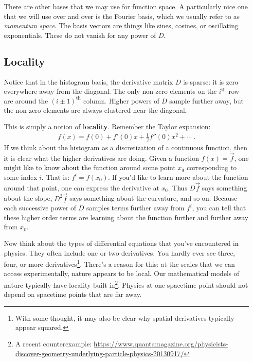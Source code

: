 There are other bases that we may use for function space. A particularly nice one that we will use over and over is the Fourier basis, which we usually refer to as \emph{momentum space}. The basis vectors are things like sines, cosines, or oscillating exponentials. These do not vanish for any power of $D$.


\subsection{Locality}

Notice that in the histogram basis, the derivative matrix $D$ is sparse: it is zero everywhere away from the diagonal. The only non-zero elements on the $i^\text{th}$ row are around the $(i\pm 1)^\text{th}$ column.  Higher powers of $D$ sample further away, but the non-zero elements are always clustered near the diagonal.

This is simply a notion of \textbf{locality}. Remember the Taylor expansion:
\begin{align}
  f(x) = f(0) + f'(0) x + \frac{1}{2} f''(0)x^2 + \cdots \ .
\end{align}
If we think about the histogram as a discretization of a continuous function, then it is clear what the higher derivatives are doing. Given a function $f(x) = \vec{f}$, one might like to know about the function around some point $x_0$ corresponding to some index $i$. That is: $f^i = f(x_0)$. If you’d like to learn more about the function around that point, one can express the derivative at $x_0$. Thus $D\vec{f}$ says something about the slope, $D^2\vec{f}$ says something about the curvature, and so on. Because each successive power of $D$ samples terms further away from $f^i$, you can tell that these higher order terms are learning about the function further and further away from $x_0$. 

Now think about the types of differential equations that you’ve encountered in physics. They often include one or two derivatives. You hardly ever see three, four, or more derivatives\footnote{With some thought, it may also be clear why spatial derivatives typically appear squared.}. There’s a reason for this: at the scales that we can access experimentally, nature appears to be local. Our mathematical models of nature typically have locality built in\footnote{A recent counterexample: \url{https://www.quantamagazine.org/physicists-discover-geometry-underlying-particle-physics-20130917/}}. Physics at one spacetime point should not depend on spacetime points that are far away. 

